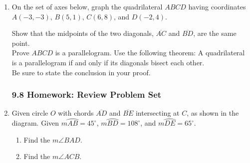 \documentclass[12pt, twoside]{article}
\begin{document}
\begin{enumerate}
\newpage
  \item On the set of axes below, graph the quadrilateral $ABCD$ having coordinates $A(-3,-3)$, $B(5,1)$, $C(6,8)$, and $D(-2,4)$.
    \begin{center} %
    \end{center}
    Show that the midpoints of the two diagonals, $\overline{AC}$ and $\overline{BD}$, are the same point. \\[5cm]
    Prove $ABCD$ is a parallelogram. Use the following theorem:
    A quadrilateral is a parallelogram if and only if its diagonals bisect each other. \\[0.5cm]
    Be sure to state the conclusion in your proof.

\newpage
\subsubsection*{9.8 Homework: Review Problem Set}
\item Given circle $O$ with chords $\overline{AD}$ and $\overline{BE}$ intersecting at $C$, as shown in the diagram. Given $m \wideparen{AB}=45^\circ$, $m \wideparen{BD}=108^\circ$, and $m \wideparen{DE}=65^\circ$.
  \begin{multicols}{2}
  \raggedcolumns
  \begin{enumerate}
    \item Find the $m\angle BAD$. \vspace{1.7cm}
    \item Find the $m\angle ACB$. \vspace{2cm}
  \end{enumerate}
  \end{multicols}


\end{enumerate}
\end{document}
